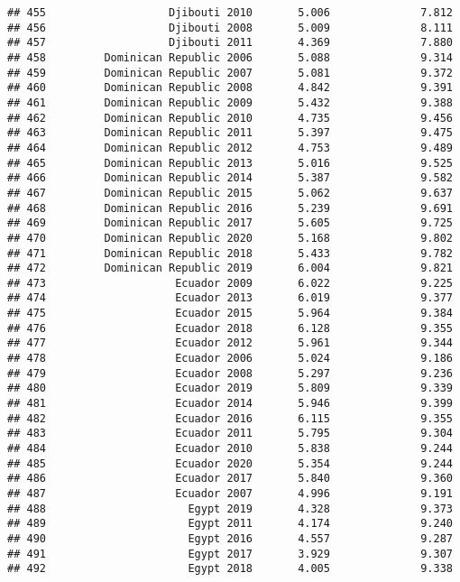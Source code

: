 \documentclass[
]{article}
\begin{document}
\begin{verbatim}
## 455                   Djibouti 2010       5.006              7.812
## 456                   Djibouti 2008       5.009              8.111
## 457                   Djibouti 2011       4.369              7.880
## 458         Dominican Republic 2006       5.088              9.314
## 459         Dominican Republic 2007       5.081              9.372
## 460         Dominican Republic 2008       4.842              9.391
## 461         Dominican Republic 2009       5.432              9.388
## 462         Dominican Republic 2010       4.735              9.456
## 463         Dominican Republic 2011       5.397              9.475
## 464         Dominican Republic 2012       4.753              9.489
## 465         Dominican Republic 2013       5.016              9.525
## 466         Dominican Republic 2014       5.387              9.582
## 467         Dominican Republic 2015       5.062              9.637
## 468         Dominican Republic 2016       5.239              9.691
## 469         Dominican Republic 2017       5.605              9.725
## 470         Dominican Republic 2020       5.168              9.802
## 471         Dominican Republic 2018       5.433              9.782
## 472         Dominican Republic 2019       6.004              9.821
## 473                    Ecuador 2009       6.022              9.225
## 474                    Ecuador 2013       6.019              9.377
## 475                    Ecuador 2015       5.964              9.384
## 476                    Ecuador 2018       6.128              9.355
## 477                    Ecuador 2012       5.961              9.344
## 478                    Ecuador 2006       5.024              9.186
## 479                    Ecuador 2008       5.297              9.236
## 480                    Ecuador 2019       5.809              9.339
## 481                    Ecuador 2014       5.946              9.399
## 482                    Ecuador 2016       6.115              9.355
## 483                    Ecuador 2011       5.795              9.304
## 484                    Ecuador 2010       5.838              9.244
## 485                    Ecuador 2020       5.354              9.244
## 486                    Ecuador 2017       5.840              9.360
## 487                    Ecuador 2007       4.996              9.191
## 488                      Egypt 2019       4.328              9.373
## 489                      Egypt 2011       4.174              9.240
## 490                      Egypt 2016       4.557              9.287
## 491                      Egypt 2017       3.929              9.307
## 492                      Egypt 2018       4.005              9.338

\end{verbatim}
\end{document}
